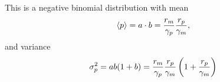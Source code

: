 This is a negative binomial distribution with mean
\begin{equation}
  \left\langle p \right\rangle = a \cdot b =
  {r_m \over \gamma_p}{r_p \over \gamma_m},
\end{equation}
and variance
\begin{equation}
  \sigma_p^2 = ab(1 + b) =
  {r_m \over \gamma_p}{r_p \over \gamma_m} \left(1 + {r_p \over \gamma_m}\right)
\end{equation}
